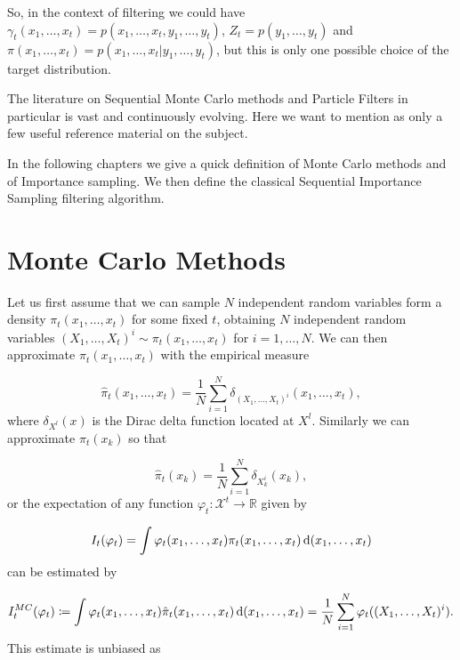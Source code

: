 So, in the context of filtering we could have $\gamma_t(x_1, \dots, x_t) = p(x_1, \dots, x_t, y_1, \dots, y_t)$, $Z_t = p(y_1, \dots, y_t)$ and $\pi(x_1, \dots, x_t) = p(x_1, \dots, x_t | y_1, \dots, y_t)$, but this is only one possible choice of the target distribution.

The literature on Sequential Monte Carlo methods and Particle Filters in particular is vast and continuously evolving. Here we want to mention \cite{DoucetBook} \cite{DoucetTutorial} \cite{Kantas} as only a few useful reference material on the subject.

In the following chapters we give a quick definition of Monte Carlo methods and of Importance sampling. We then define the classical Sequential Importance Sampling filtering algorithm.






\section{Monte Carlo Methods} \label{sec:MonteCarlo}

Let us first assume that we can sample $N$ independent random variables form a density $\pi_t(x_1, \dots, x_t)$ for some fixed $t$, obtaining $N$ independent random variables $(X_1, \dots, X_t)^i \sim \pi_t(x_1, \dots, x_t)$ for $i = 1, \dots, N$. We can then approximate $\pi_t(x_1, \dots, x_t)$ with the empirical measure

\begin{equation*}
    \hat{\pi}_t(x_1, \dots, x_t) = \frac{1}{N} \sum_{i=1}^N \delta_{(X_1, \dots, X_t)^i}(x_1, \dots, x_t),
\end{equation*}
where $\delta_{X^l}(x)$ is the Dirac delta function located at $X^l$. Similarly we can approximate $\pi_t(x_k)$ so that

\begin{equation*}
    \hat{\pi}_t(x_k) = \frac{1}{N} \sum_{i=1}^N \delta_{X_k^i}(x_k),
\end{equation*}
or the expectation of any function $\varphi_t : \mathcal{X}^t \rightarrow \mathbb{R}$ given by

\begin{equation*}
    I_t(\varphi_t) = \int \varphi_t (x_1, \dots, x_t) \pi_t (x_1, \dots, x_t) \operatorname{d}\!{(}x_1, \dots, x_t)
\end{equation*}
can be estimated by

\begin{equation*}
    I^{MC}_t(\varphi_t) \coloneqq \int \varphi_t(x_1, \dots, x_t) \hat{\pi}_t (x_1, \dots, x_t) \operatorname{d}\!{(}x_1, \dots, x_t) = \frac{1}{N} \sum_{i=1}^N \varphi_t((X_1, \dots, X_t)^i).
\end{equation*}
This estimate is unbiased as

